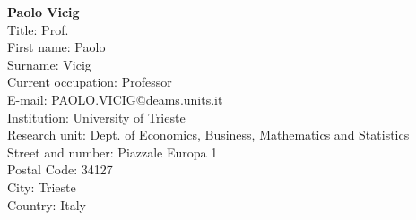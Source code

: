 \documentclass[11pt,dvipsnames,usenames,a4paper]{article}
\begin{document}
{\bf Paolo Vicig}\\
Title: Prof.\\
First name: Paolo\\
Surname:  Vicig \\
Current occupation: Professor\\
E-mail: PAOLO.VICIG@deams.units.it\\
Institution: University of Trieste\\
Research unit: Dept. of Economics, Business, Mathematics and Statistics\\
Street and number: Piazzale Europa 1\\
Postal Code: 34127\\
City: Trieste\\
Country: Italy\\[-7pt]


\end{document}
